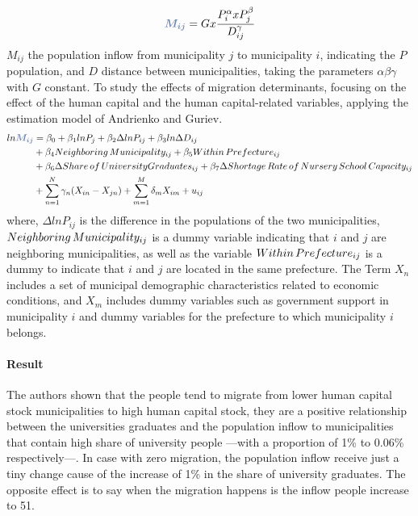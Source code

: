 \documentclass[11pt]{article}
\theoremstyle{prop}
\begin{document}
	\begin{equation}
		{\color{BlueG}\hm{M_{ij}}}=Gx\frac{P_i^\alpha x P_j^\beta }{D_{ij}^\gamma}
	\end{equation}
	$M_{ij}$ the population inflow from municipality $j$ to municipality $i$, indicating the $P$ population, and $D$ distance between municipalities, taking the parameters $\alpha \beta \gamma$ with $G$ constant. To study the effects of migration determinants, focusing on the effect of the human capital and the human capital-related variables, applying the estimation model of Andrienko and Guriev.
	\begin{equation}
	\begin{split}	
		ln {\color{BlueG}\hm{M_{ij}}} &= \beta_0 + \beta_1lnP_j +\beta_2 \Delta lnP_{ij} +\beta_3 ln \Delta D_{ij} \\		
				&+\beta_4 Neighboring \thinspace Municipality_{ij} + \beta_5 Within\thinspace Prefecture_{ij} \\
	    		&+\beta_6 \Delta Share\thinspace of \thinspace University Graduates_{ij} +\beta_7 \Delta Shortage\thinspace Rate\thinspace of \thinspace Nursery \thinspace School \thinspace Capacity_{ij} \\
				&+\sum_{n=1}^{N} \gamma_n (X_{in}-X_{jn}) + \sum_{m=1}^{M} \delta_m X_{im} + u_{ij}  
	\end{split}		
	\end{equation}
	where, $ \Delta lnP_{ij}$ is the difference in the populations of the two municipalities, $Neighboring\thinspace Municipality_{ij}$ is a dummy variable indicating that $i$ and $j$ are neighboring municipalities, as well as the variable $Within\thinspace Prefecture_{ij}$ is a dummy to indicate that $i$ and $j$ are located in the same prefecture.
	The Term $X_n$ includes a set of municipal demographic characteristics related to economic conditions, and $X_m$ includes dummy variables such as government support in
	municipality $i$ and dummy variables for the prefecture to which municipality $i$ belongs.
	
	\paragraph {Result} The authors shown that the people tend to migrate from lower human capital stock municipalities to high human capital stock, they are a positive relationship between the universities graduates and the population inflow to municipalities that contain high share of university people ---with a proportion of 1\% to 0.06\% respectively---. In case with zero migration, the population inflow receive just a tiny change cause of the increase of 1\%  in the share of university graduates. The opposite effect is to say when the migration happens is the inflow people increase to 51.
	
\end{document}
